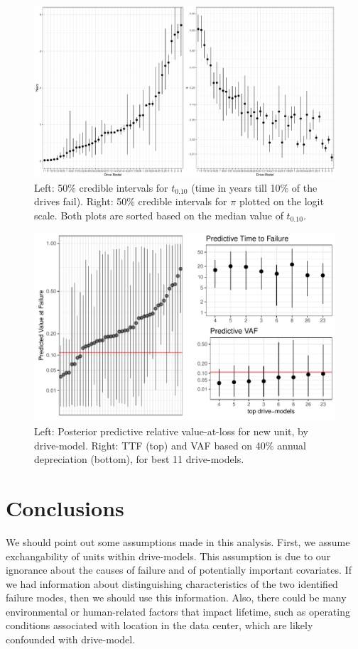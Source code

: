 \documentclass[12pt]{article}
\begin{document}
\begin{figure}[H]
  \centering
  \includegraphics[width=\textwidth]{fig/b10andpi}
  \caption{Left: 50\% credible intervals for  $t_{0.10}$ (time in years till 10\% of the drives fail). Right: 50\% credible intervals for $\pi$ plotted on the logit scale.  Both plots are sorted based on the median value of $t_{0.10}$.}
  \label{fig4}
\end{figure}

\begin{figure}[H]
  \centering
  \includegraphics[width=.8\textwidth]{fig/dm-eval}
  \caption{Left: Posterior predictive relative value-at-loss for new
    unit, by drive-model. Right: TTF (top) and VAF based on 40\% annual depreciation (bottom), for best 11 drive-models.}
  \label{fig5}
\end{figure}


\section{Conclusions}
\label{sec:Conclusions}
We should point out some assumptions made in this analysis. First, we assume exchangability of units within drive-models. This assumption is due to our ignorance about the causes of failure and of potentially important covariates. If we had information about distinguishing characteristics of the two identified failure modes, then we should use this information. Also, there could be many environmental or human-related factors that impact lifetime, such as operating conditions associated with location in the data center, which are likely confounded with drive-model.
\end{document}
